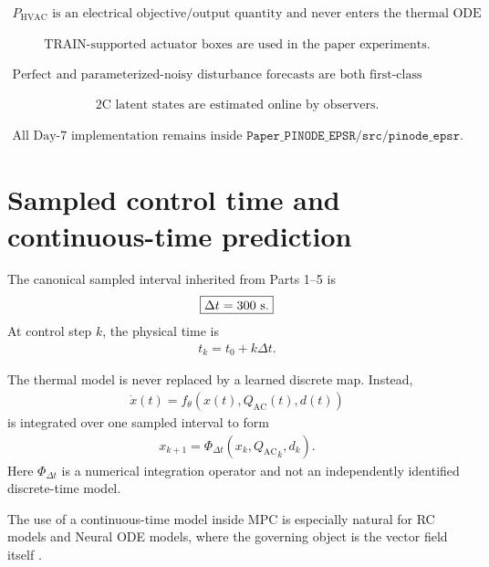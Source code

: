 \documentclass[11pt]{article}
\newcommand{\QAC}{Q_{\mathrm{AC}}}
\newcommand{\PHVAC}{P_{\mathrm{HVAC}}}
\newcommand{\dt}{\Delta t}
\newcommand{\PhiM}{\Phi_{\Delta t}}
\begin{document}
\begin{align}
\boxed{\PHVAC\text{ is an electrical objective/output quantity and never enters the thermal ODE RHS.}}
\end{align}

\begin{align}
\boxed{\text{TRAIN-supported actuator boxes are used in the paper experiments.}}
\end{align}

\begin{align}
\boxed{\text{Perfect and parameterized-noisy disturbance forecasts are both first-class modes.}}
\end{align}

\begin{align}
\boxed{\text{2C latent states are estimated online by observers.}}
\end{align}

\begin{align}
\boxed{\text{All Day-7 implementation remains inside }\texttt{Paper\_PINODE\_EPSR/src/pinode\_epsr}.}
\end{align}

\section{Sampled control time and continuous-time prediction}

The canonical sampled interval inherited from Parts 1--5 is
\begin{align}
\boxed{\dt=300\ {\rm s}.}
\end{align}
At control step \(k\), the physical time is
\begin{align}
t_k=t_0+k\dt.
\end{align}

The thermal model is never replaced by a learned discrete map.  Instead,
\begin{align}
\boxed{\dot x(t)=f_\theta\!\left(x(t),\QAC(t),d(t)\right)}
\tag{6.1}
\end{align}
is integrated over one sampled interval to form
\begin{align}
\boxed{
x_{k+1}
=
\PhiM\!\left(x_k,{\QAC}_k,d_k\right).
}
\tag{6.2}
\end{align}
Here \(\PhiM\) is a numerical integration operator and not an independently identified
discrete-time model.

The use of a continuous-time model inside MPC is especially natural for RC models and Neural
ODE models, where the governing object is the vector field itself
\citep{bacher2011heat,chen2018node}.
\end{document}
